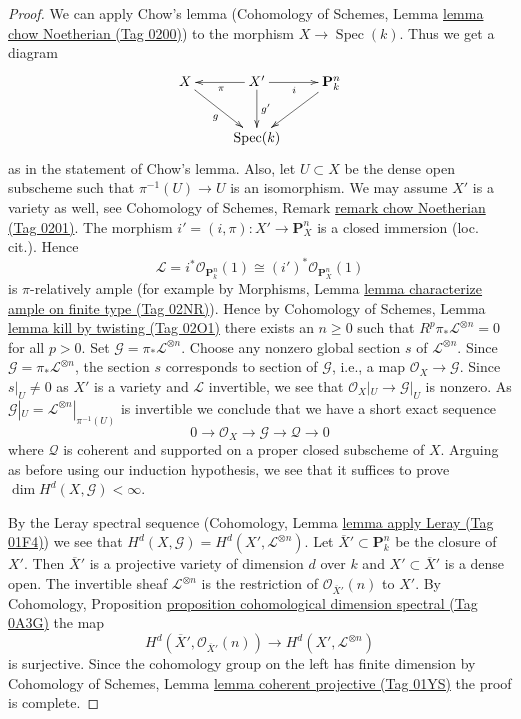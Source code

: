 \documentclass{amsart}
\theoremstyle{plain}
\theoremstyle{definition}
\theoremstyle{remark}
\numberwithin{equation}{subsection}
\def\Spec{\mathop{\mathrm{Spec}}}
\begin{document}
\begin{proof}
\medskip\noindent
We can apply Chow's lemma
(Cohomology of Schemes, Lemma \href{https://stacks.math.columbia.edu/tag/0200}{lemma chow Noetherian (Tag 0200)})
to the morphism $X \to \Spec(k)$. Thus we get a diagram
$$
\xymatrix{
X \ar[rd]_g & X' \ar[d]^-{g'} \ar[l]^\pi \ar[r]_i & \mathbf{P}^n_k \ar[dl] \\
& \Spec(k) &
}
$$
as in the statement of Chow's lemma. Also, let $U \subset X$ be
the dense open subscheme such that $\pi^{-1}(U) \to U$ is an isomorphism.
We may assume $X'$ is a variety as well, see
Cohomology of Schemes, Remark \href{https://stacks.math.columbia.edu/tag/0201}{remark chow Noetherian (Tag 0201)}.
The morphism $i' = (i, \pi) : X' \to \mathbf{P}^n_X$ is
a closed immersion (loc. cit.). Hence
$$
\mathcal{L} = i^*\mathcal{O}_{\mathbf{P}^n_k}(1) \cong
(i')^*\mathcal{O}_{\mathbf{P}^n_X}(1)
$$
is $\pi$-relatively ample (for example by
Morphisms, Lemma \href{https://stacks.math.columbia.edu/tag/02NR}{lemma characterize ample on finite type (Tag 02NR)}).
Hence by Cohomology of Schemes, Lemma \href{https://stacks.math.columbia.edu/tag/02O1}{lemma kill by twisting (Tag 02O1)}
there exists an $n \geq 0$ such that
$R^p\pi_*\mathcal{L}^{\otimes n} = 0$ for all $p > 0$.
Set $\mathcal{G} = \pi_*\mathcal{L}^{\otimes n}$.
Choose any nonzero global section $s$ of $\mathcal{L}^{\otimes n}$.
Since $\mathcal{G} = \pi_*\mathcal{L}^{\otimes n}$, the section $s$
corresponds to section of $\mathcal{G}$, i.e., a map
$\mathcal{O}_X \to \mathcal{G}$.
Since $s|_U \not = 0$ as $X'$ is a variety and $\mathcal{L}$
invertible, we see that $\mathcal{O}_X|_U \to \mathcal{G}|_U$
is nonzero. As $\mathcal{G}|_U = \mathcal{L}^{\otimes n}|_{\pi^{-1}(U)}$
is invertible we conclude that we have a short exact sequence
$$
0 \to \mathcal{O}_X \to \mathcal{G} \to \mathcal{Q} \to 0
$$
where $\mathcal{Q}$ is coherent and supported on a proper
closed subscheme of $X$. Arguing as before using our induction
hypothesis, we see that it
suffices to prove $\dim H^d(X, \mathcal{G}) < \infty$.

\medskip\noindent
By the Leray spectral sequence
(Cohomology, Lemma \href{https://stacks.math.columbia.edu/tag/01F4}{lemma apply Leray (Tag 01F4)})
we see that $H^d(X, \mathcal{G}) = H^d(X', \mathcal{L}^{\otimes n})$.
Let $\overline{X}' \subset \mathbf{P}^n_k$ be the closure
of $X'$. Then $\overline{X}'$ is a projective variety of dimension $d$
over $k$ and $X' \subset \overline{X}'$ is a dense open.
The invertible sheaf $\mathcal{L}^{\otimes n}$ is the restriction of
$\mathcal{O}_{\overline{X}'}(n)$ to $X'$. By
Cohomology, Proposition
\href{https://stacks.math.columbia.edu/tag/0A3G}{proposition cohomological dimension spectral (Tag 0A3G)}
the map
$$
H^d(\overline{X}', \mathcal{O}_{\overline{X}'}(n))
\longrightarrow
H^d(X', \mathcal{L}^{\otimes n})
$$
is surjective. Since the cohomology group on the left has
finite dimension by
Cohomology of Schemes, Lemma \href{https://stacks.math.columbia.edu/tag/01YS}{lemma coherent projective (Tag 01YS)}
the proof is complete.
\end{proof}
\end{document}
